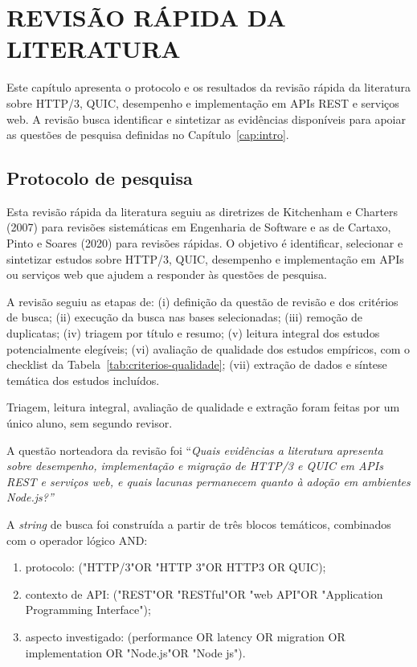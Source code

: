 ﻿\chapter{REVISÃO RÁPIDA DA LITERATURA}\label{cap:revisao}

Este capítulo apresenta o protocolo e os resultados da revisão rápida da literatura sobre HTTP/3, QUIC, desempenho e implementação em APIs REST e serviços web. A revisão busca identificar e sintetizar as evidências disponíveis para apoiar as questões de pesquisa definidas no Capítulo~\ref{cap:intro}.

\section{Protocolo de pesquisa}

Esta revisão rápida da literatura seguiu as diretrizes de Kitchenham e Charters (2007) para revisões sistemáticas em Engenharia de Software e as de Cartaxo, Pinto e Soares (2020) para revisões rápidas. O objetivo é identificar, selecionar e sintetizar estudos sobre HTTP/3, QUIC, desempenho e implementação em APIs ou serviços web que ajudem a responder às questões de pesquisa.

A revisão seguiu as etapas de: (i) definição da questão de revisão e dos critérios de busca; (ii) execução da busca nas bases selecionadas; (iii) remoção de duplicatas; (iv) triagem por título e resumo; (v) leitura integral dos estudos potencialmente elegíveis; (vi) avaliação de qualidade dos estudos empíricos, com o checklist da Tabela~\ref{tab:criterios-qualidade}; (vii) extração de dados e síntese temática dos estudos incluídos.

Triagem, leitura integral, avaliação de qualidade e extração foram feitas por um único aluno, sem segundo revisor.

A questão norteadora da revisão foi ``\textit{Quais evidências a literatura apresenta sobre desempenho, implementação e migração de HTTP/3 e QUIC em APIs REST e serviços web, e quais lacunas permanecem quanto à adoção em ambientes Node.js?}\textit{''}

A \textit{string} de busca foi construída a partir de três blocos temáticos, combinados com o operador lógico AND:

\begin{enumerate}[label=\alph*)]
\item protocolo: ("HTTP/3"OR "HTTP 3"OR HTTP3 OR QUIC);
\item contexto de API: ("REST"OR "RESTful"OR "web API"OR "Application Programming Interface");
\item aspecto investigado: (performance OR latency OR migration OR implementation OR "Node.js"OR "Node js").
\end{enumerate}


